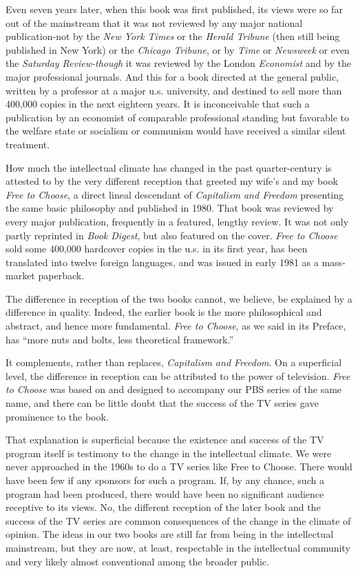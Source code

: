 \documentclass[11pt,openany]{book}
\begin{document}
Even seven years later, when this book was first published, its views were so far out of the mainstream that it was not reviewed by any major national publication-not by the \emph{New York Times} or the \emph{Herald Tribune} (then still being published in New York) or the \emph{Chicago Tribune}, or by \emph{Time} or \emph{Newsweek} or even the \emph{Saturday Review-though} it was reviewed by the London \emph{Economist} and by the major professional journals. And this for a book directed at the general public, written by a professor at a major u.s. university, and destined to sell more than 400,000 copies in the next eighteen years. It is inconceivable that such a publication by an economist of comparable professional standing but favorable to the welfare state or socialism or communism would have received a similar silent treatment.

How much the intellectual climate has changed in the past quarter-century is attested to by the very different reception that greeted my wife's and my book \emph{Free to Choose}, a direct lineal descendant of \emph{Capitalism and Freedom} presenting the same basic philosophy and published in 1980. That book was reviewed by every major publication, frequently in a featured, lengthy review. It was not only partly reprinted in \emph{Book Digest}, but also featured on the cover. \emph{Free to Choose} sold some 400,000 hardcover copies in the u.s. in its first year, has been translated into twelve foreign languages, and was issued in early 1981 as a mass-market paperback.

The difference in reception of the two books cannot, we believe, be explained by a difference in quality. Indeed, the earlier book is the more philosophical and abstract, and hence more fundamental. \emph{Free to Choose}, as we said in its Preface, has ``more nuts and bolts, less theoretical framework.''

It complements, rather than replaces, \emph{Capitalism and Freedom}. On a superficial level, the difference in reception can be attributed to the power of television. \emph{Free to Choose} was based on and designed to accompany our PBS series of the same name, and there can be little doubt that the success of the TV series gave prominence to the book.

That explanation is superficial because the existence and success of the TV program itself is testimony to the change in the intellectual climate. We were never approached in the 1960s to do a TV series like Free to Choose. There would have been few if any sponsors for such a program. If, by any chance, such a program had been produced, there would have been no significant audience receptive to its views. No, the different reception of the later book and the success of the TV series are common consequences of the change in the climate of opinion. The ideas in our two books are still far from being in the intellectual mainstream, but they are now, at least, respectable in the intellectual community and very likely almost conventional among the broader public.
\end{document}
